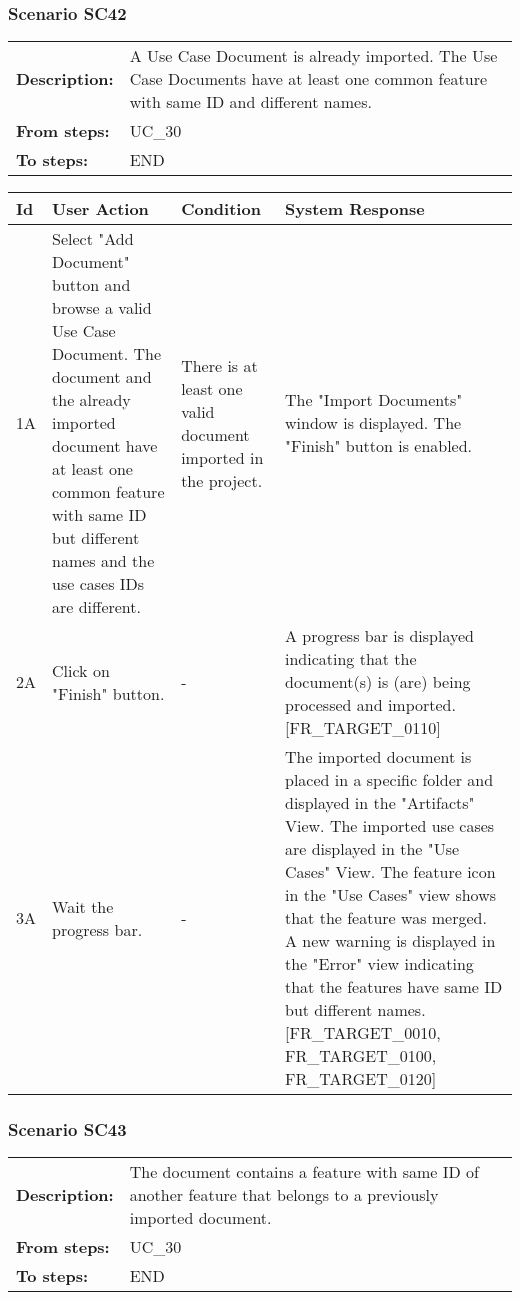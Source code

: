 \documentclass[a4paper,11pt]{article}
\newcommand{\bl}{\\ \hline}
\begin{document}
\subsubsection*{Scenario SC42}
\begin{tabular}{p{1in}p{4in}}
{\bf Description:} & A Use Case Document is already imported. The Use Case
					Documents have at least one common feature with same ID and
					different names. \\
{\bf From steps:} & UC_30#2M \\
{\bf To steps:} & END \\
\end{tabular}
 
\begin{tabular}{|p{0.8in}|p{1.6in}|p{1.6in}|p{1.6in}|}
\hline
Id & User Action & Condition & System Response  \bl 
1A & Select "Add Document" button and browse a valid Use Case
						Document. The document and the already imported document have at
						least one common feature with same ID but different names and the
						use cases IDs are different.  & There is at least one valid document imported in the
						project. & The "Import Documents" window is displayed. The "Finish"
						button is enabled. \bl 
2A & Click on "Finish" button. & - & A progress bar is displayed indicating that the
						document(s) is (are) being processed and imported.
						[FR_TARGET_0110]  \bl 
3A & Wait the progress bar.  & - & The imported document is placed in a specific folder and
						displayed in the "Artifacts" View. The imported use cases are
						displayed in the "Use Cases" View. The feature icon in the "Use
						Cases" view shows that the feature was merged. A new warning is
						displayed in the "Error" view indicating that the features have
						same ID but different names. [FR_TARGET_0010, FR_TARGET_0100,
						FR_TARGET_0120] \bl 
\end{tabular}
\subsubsection*{Scenario SC43}
\begin{tabular}{p{1in}p{4in}}
{\bf Description:} & The document contains a feature with same ID of another
					feature that belongs to a previously imported document.
				 \\
{\bf From steps:} & UC_30#2M \\
{\bf To steps:} & END \\
\end{tabular}
 
\end{document}
